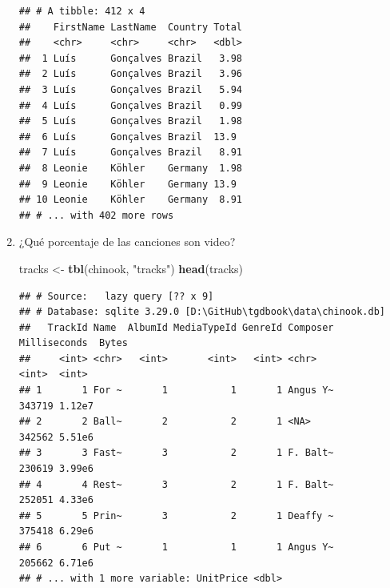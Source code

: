 \documentclass[]{book}
\newenvironment{Shaded}{\begin{snugshade}}{\end{snugshade}}
\newcommand{\KeywordTok}[1]{\textcolor[rgb]{0.13,0.29,0.53}{\textbf{#1}}}
\newcommand{\DataTypeTok}[1]{\textcolor[rgb]{0.13,0.29,0.53}{#1}}
\newcommand{\StringTok}[1]{\textcolor[rgb]{0.31,0.60,0.02}{#1}}
\newcommand{\OperatorTok}[1]{\textcolor[rgb]{0.81,0.36,0.00}{\textbf{#1}}}
\newcommand{\NormalTok}[1]{#1}
\begin{document}
\begin{enumerate}
\begin{Shaded}
\end{Shaded}

\begin{verbatim}
## # A tibble: 412 x 4
##    FirstName LastName  Country Total
##    <chr>     <chr>     <chr>   <dbl>
##  1 Luís      Gonçalves Brazil   3.98
##  2 Luís      Gonçalves Brazil   3.96
##  3 Luís      Gonçalves Brazil   5.94
##  4 Luís      Gonçalves Brazil   0.99
##  5 Luís      Gonçalves Brazil   1.98
##  6 Luís      Gonçalves Brazil  13.9 
##  7 Luís      Gonçalves Brazil   8.91
##  8 Leonie    Köhler    Germany  1.98
##  9 Leonie    Köhler    Germany 13.9 
## 10 Leonie    Köhler    Germany  8.91
## # ... with 402 more rows
\end{verbatim}
\item
  ¿Qué porcentaje de las canciones son video?

\begin{Shaded}
\begin{Highlighting}[]
\NormalTok{tracks <-}\StringTok{ }\KeywordTok{tbl}\NormalTok{(chinook, }\StringTok{"tracks"}\NormalTok{)}
\KeywordTok{head}\NormalTok{(tracks) }
\end{Highlighting}
\end{Shaded}

\begin{verbatim}
## # Source:   lazy query [?? x 9]
## # Database: sqlite 3.29.0 [D:\GitHub\tgdbook\data\chinook.db]
##   TrackId Name  AlbumId MediaTypeId GenreId Composer Milliseconds  Bytes
##     <int> <chr>   <int>       <int>   <int> <chr>           <int>  <int>
## 1       1 For ~       1           1       1 Angus Y~       343719 1.12e7
## 2       2 Ball~       2           2       1 <NA>           342562 5.51e6
## 3       3 Fast~       3           2       1 F. Balt~       230619 3.99e6
## 4       4 Rest~       3           2       1 F. Balt~       252051 4.33e6
## 5       5 Prin~       3           2       1 Deaffy ~       375418 6.29e6
## 6       6 Put ~       1           1       1 Angus Y~       205662 6.71e6
## # ... with 1 more variable: UnitPrice <dbl>
\end{verbatim}

\begin{Shaded}
\end{Shaded}


\end{enumerate}
\end{document}
